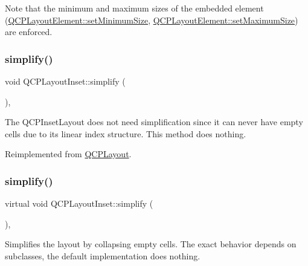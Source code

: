 Note that the minimum and maximum sizes of the embedded element (\hyperlink{class_q_c_p_layout_element_a5dd29a3c8bc88440c97c06b67be7886b}{Q\+C\+P\+Layout\+Element\+::set\+Minimum\+Size}, \hyperlink{class_q_c_p_layout_element_a74eb5280a737ab44833d506db65efd95}{Q\+C\+P\+Layout\+Element\+::set\+Maximum\+Size}) are enforced. \mbox{\label{class_q_c_p_layout_inset_a18b7d508f0baa60cc5dcb1343cf7f32a}} 
\subsubsection{\texorpdfstring{simplify()}{simplify()}\hspace{0.1cm}{\footnotesize\ttfamily [1/2]}}
{\footnotesize\ttfamily void Q\+C\+P\+Layout\+Inset\+::simplify (\begin{DoxyParamCaption}{ }\end{DoxyParamCaption})\hspace{0.3cm}{\ttfamily [inline]}, {\ttfamily [virtual]}}

The Q\+C\+P\+Inset\+Layout does not need simplification since it can never have empty cells due to its linear index structure. This method does nothing. 

Reimplemented from \hyperlink{class_q_c_p_layout_a41e6ac049143866e8f8b4964efab01b2}{Q\+C\+P\+Layout}.

\mbox{\label{class_q_c_p_layout_inset_abdac9a04752751ea68c320016086a2e8}} 
\subsubsection{\texorpdfstring{simplify()}{simplify()}\hspace{0.1cm}{\footnotesize\ttfamily [2/2]}}
{\footnotesize\ttfamily virtual void Q\+C\+P\+Layout\+Inset\+::simplify (\begin{DoxyParamCaption}{ }\end{DoxyParamCaption})\hspace{0.3cm}{\ttfamily [inline]}, {\ttfamily [virtual]}}

Simplifies the layout by collapsing empty cells. The exact behavior depends on subclasses, the default implementation does nothing.

